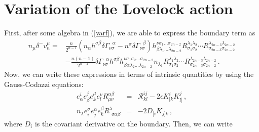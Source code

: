 \documentclass[11pt,letterpaper]{article}
\newcommand{\dslash}{\delta^{\!\!\!\!-}\!}
\begin{document}
\section{Variation of the Lovelock action}
First, after some algebra in (\ref{varf}), we are able to express the boundary term as
\begin{equation}
\begin{aligned}
n_{\mu}\dslash  v_n^{\mu}=&\frac{n}{2^{n-1}}\left(n_{\alpha}h^{\sigma\beta}\delta \Gamma_{\nu\sigma}^{\ \ \ \alpha}-n^{\sigma}\delta \Gamma_{\nu\sigma}^{\ \ \ \beta}\right)h^{\nu \sigma_1\dots\sigma_{2n-2}}_{\beta \lambda_1\dots \lambda_{2n-2}}R_{\sigma_1\sigma_2}^{\lambda_1\lambda_2}\cdots R_{\sigma_{2n-3}\sigma_{2n-2}}^{\lambda_{2n-3}\lambda_{2n-2}}\\
&-\frac{n(n-1)}{2^{n-2}}\delta \Gamma_{\nu\sigma}^{\ \ \ \alpha}h^{\sigma\beta}h^{\nu \sigma_1\sigma_2\dots\sigma_{2n-2}}_{\beta \alpha \lambda_2\dots \lambda_{2n-2}}n_{\lambda_1}R_{\sigma_1\sigma_2}^{\lambda_1\lambda_2}\cdots R_{\sigma_{2n-3}\sigma_{2n-2}}^{\lambda_{2n-3}\lambda_{2n-2}}\, .
\end{aligned}
\end{equation}
Now, we can write these expressions in terms of intrinsic quantities by using the Gauss-Codazzi equations:
\begin{eqnarray}
e^{i}_{\alpha}e^{j}_{\beta}e^{\mu}_{k}e^{\nu}_{l}R^{\alpha\beta}_{\mu\nu}&=&\mathcal{R}^{ij}_{kl}-2\epsilon K^{i}_{[k}K^{j}_{l]}\, ,\\
n_{\lambda}e_{i}^{\sigma}e_{j}^{\alpha}e_{k}^{\beta}R^{\lambda}_{\ \ \sigma\alpha\beta}&=&-2D_{[i}K_{j]k}\, ,
\end{eqnarray}
where $D_i$ is the covariant derivative on the boundary. Then, we can write
\end{document}
